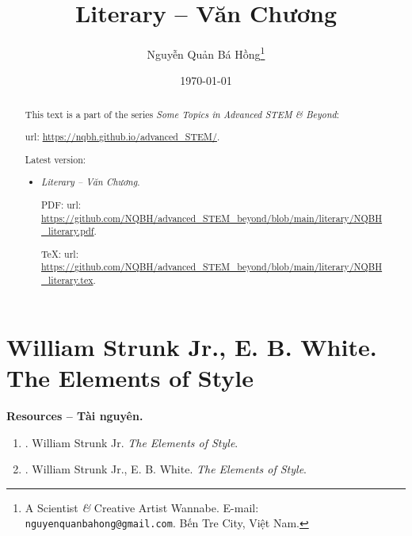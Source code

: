 \documentclass{article}
\title{Literary -- Văn Chương}
\author{Nguyễn Quản Bá Hồng\footnote{A Scientist {\it\&} Creative Artist Wannabe. E-mail: {\tt nguyenquanbahong@gmail.com}. Bến Tre City, Việt Nam.}}
\date{\today}
\begin{document}
\maketitle
\begin{abstract}
	This text is a part of the series {\it Some Topics in Advanced STEM \& Beyond}:
	
	{\sc url}: \url{https://nqbh.github.io/advanced_STEM/}.
	
	Latest version:
	\begin{itemize}
		\item {\it Literary -- Văn Chương}.
		
		PDF: {\sc url}: \url{https://github.com/NQBH/advanced_STEM_beyond/blob/main/literary/NQBH_literary.pdf}.
		
		\TeX: {\sc url}: \url{https://github.com/NQBH/advanced_STEM_beyond/blob/main/literary/NQBH_literary.tex}.
	\end{itemize}
\end{abstract}
\tableofcontents


\section{{\sc William Strunk Jr., E. B. White}. The Elements of Style}
{\bf \textsf{Resources -- Tài nguyên.}}
\begin{enumerate}
	\item \cite{Strunk_element_style}. {\sc William Strunk Jr.} {\it The Elements of Style}.
	\item \cite{Strunk_White_element_style}. {\sc William Strunk Jr., E. B. White}. {\it The Elements of Style}.
\end{enumerate}
\end{document}
